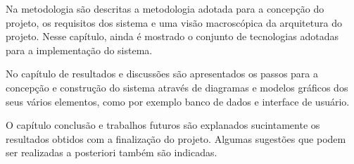 Na metodologia são descritas a metodologia adotada para a concepção do projeto, os requisitos dos sistema e uma visão macroscópica da arquitetura do projeto. Nesse capítulo, ainda é mostrado o conjunto de tecnologias adotadas para a implementação do sistema.    

No capítulo de resultados e discussões são apresentados os passos para a concepção e construção do sistema através de diagramas e modelos gráficos dos seus vários elementos, como por exemplo banco de dados e interface de usuário.

O capítulo conclusão e trabalhos futuros são explanados sucintamente os resultados obtidos com a finalização do projeto. Algumas sugestões que podem ser realizadas a posteriori também são indicadas.
